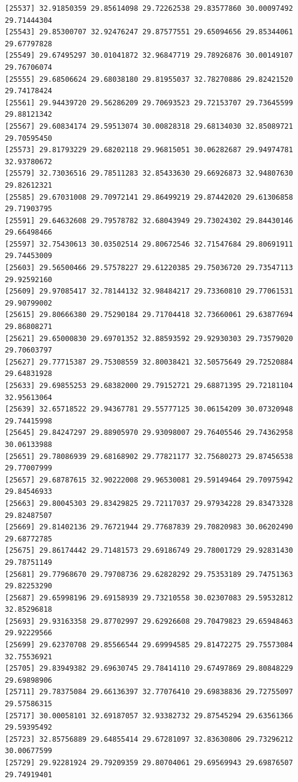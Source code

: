 \documentclass[
  letterpaper,
  DIV=11,
  numbers=noendperiod]{scrartcl}
\begin{document}
\begin{verbatim}
[25537] 32.91850359 29.85614098 29.72262538 29.83577860 30.00097492 29.71444304
[25543] 29.85300707 32.92476247 29.87577551 29.65094656 29.85344061 29.67797828
[25549] 29.67495297 30.01041872 32.96847719 29.78926876 30.00149107 29.76706074
[25555] 29.68506624 29.68038180 29.81955037 32.78270886 29.82421520 29.74178424
[25561] 29.94439720 29.56286209 29.70693523 29.72153707 29.73645599 29.88121342
[25567] 29.60834174 29.59513074 30.00828318 29.68134030 32.85089721 29.70595450
[25573] 29.81793229 29.68202118 29.96815051 30.06282687 29.94974781 32.93780672
[25579] 32.73036516 29.78511283 32.85433630 29.66926873 32.94807630 29.82612321
[25585] 29.67031008 29.70972141 29.86499219 29.87442020 29.61306858 29.71903795
[25591] 29.64632608 29.79578782 32.68043949 29.73024302 29.84430146 29.66498466
[25597] 32.75430613 30.03502514 29.80672546 32.71547684 29.80691911 29.74453009
[25603] 29.56500466 29.57578227 29.61220385 29.75036720 29.73547113 29.92592160
[25609] 29.97085417 32.78144132 32.98484217 29.73360810 29.77061531 29.90799002
[25615] 29.80666380 29.75290184 29.71704418 32.73660061 29.63877694 29.86808271
[25621] 29.65000830 29.69701352 32.88593592 29.92930303 29.73579020 29.70603797
[25627] 29.77715387 29.75308559 32.80038421 32.50575649 29.72520884 29.64831928
[25633] 29.69855253 29.68382000 29.79152721 29.68871395 29.72181104 32.95613064
[25639] 32.65718522 29.94367781 29.55777125 30.06154209 30.07320948 29.74415998
[25645] 29.84247297 29.88905970 29.93098007 29.76405546 29.74362958 30.06133988
[25651] 29.78086939 29.68168902 29.77821177 32.75680273 29.87456538 29.77007999
[25657] 29.68787615 32.90222008 29.96530081 29.59149464 29.70975942 29.84546933
[25663] 29.80045303 29.83429825 29.72117037 29.97934228 29.83473328 29.82487507
[25669] 29.81402136 29.76721944 29.77687839 29.70820983 30.06202490 29.68772785
[25675] 29.86174442 29.71481573 29.69186749 29.78001729 29.92831430 29.78751149
[25681] 29.77968670 29.79708736 29.62828292 29.75353189 29.74751363 29.82253290
[25687] 29.65998196 29.69158939 29.73210558 30.02307083 29.59532812 32.85296818
[25693] 29.93163358 29.87702997 29.62926608 29.70479823 29.65948463 29.92229566
[25699] 29.62370708 29.85566544 29.69994585 29.81472275 29.75573084 32.75536921
[25705] 29.83949382 29.69630745 29.78414110 29.67497869 29.80848229 29.69898906
[25711] 29.78375084 29.66136397 32.77076410 29.69838836 29.72755097 29.57586315
[25717] 30.00058101 32.69187057 32.93382732 29.87545294 29.63561366 29.59395492
[25723] 32.85756889 29.64855414 29.67281097 32.83630806 29.73296212 30.00677599
[25729] 29.92281924 29.79209359 29.80704061 29.69569943 29.69876507 29.74919401

\end{verbatim}
\end{document}
